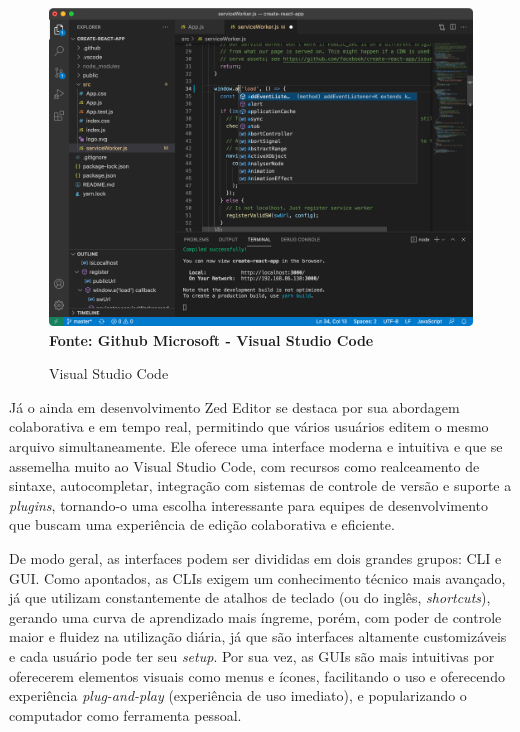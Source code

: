 \FloatBarrier

\begin{figure}[!htbp]
    \centering
    \caption{Visual Studio Code}
    \includegraphics[scale=0.3]{imagens/VSCode}
    \\\textbf{Fonte: Github Microsoft - Visual Studio Code} \label{fig:VSCode}
\end{figure}
\FloatBarrier

Já o ainda em desenvolvimento Zed Editor se destaca por sua abordagem
colaborativa e em tempo real, permitindo que vários usuários editem o mesmo arquivo
simultaneamente. Ele oferece uma interface moderna e intuitiva e que se
assemelha muito ao Visual Studio Code, com recursos como realceamento de sintaxe,
autocompletar, integração com sistemas de controle de versão e suporte a \textit{plugins},
tornando-o uma escolha interessante para equipes de desenvolvimento que buscam
uma experiência de edição colaborativa e eficiente.

De modo geral, as interfaces podem ser divididas em dois grandes grupos: CLI e
GUI. Como apontados, as CLIs exigem um conhecimento técnico mais avançado, já que
utilizam constantemente de atalhos de teclado (ou do inglês, \textit{shortcuts}),
gerando uma curva de aprendizado mais íngreme, porém, com poder de controle
maior e fluidez na utilização diária, já que são interfaces altamente customizáveis
e cada usuário pode ter seu \textit{setup}. Por sua vez, as GUIs são mais
intuitivas por oferecerem elementos visuais como menus e ícones, facilitando o uso
e oferecendo experiência \textit{plug-and-play} (experiência de uso imediato), e
popularizando o computador como ferramenta pessoal.

